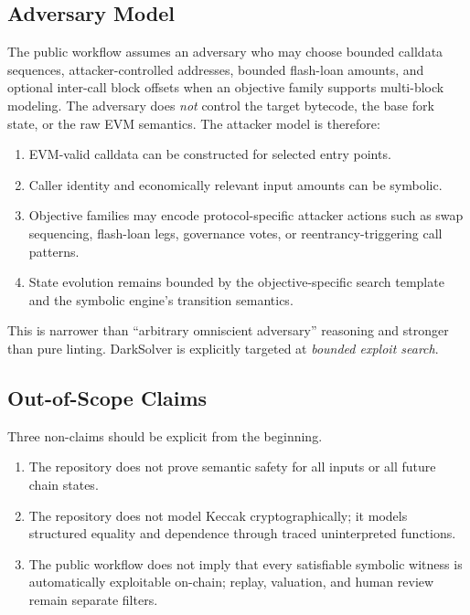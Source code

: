 \documentclass[11pt]{article}
\numberwithin{equation}{section}
\theoremstyle{remark}
\begin{document}
\subsection{Adversary Model}

The public workflow assumes an adversary who may choose bounded calldata sequences, attacker-controlled addresses, bounded flash-loan amounts, and optional inter-call block offsets when an objective family supports multi-block modeling. The adversary does \emph{not} control the target bytecode, the base fork state, or the raw EVM semantics. The attacker model is therefore:
\begin{enumerate}[leftmargin=1.5em]
  \item EVM-valid calldata can be constructed for selected entry points.
  \item Caller identity and economically relevant input amounts can be symbolic.
  \item Objective families may encode protocol-specific attacker actions such as swap sequencing, flash-loan legs, governance votes, or reentrancy-triggering call patterns.
  \item State evolution remains bounded by the objective-specific search template and the symbolic engine's transition semantics.
\end{enumerate}

This is narrower than ``arbitrary omniscient adversary'' reasoning and stronger than pure linting. DarkSolver is explicitly targeted at \emph{bounded exploit search}.

\subsection{Out-of-Scope Claims}

Three non-claims should be explicit from the beginning.
\begin{enumerate}[leftmargin=1.5em]
  \item The repository does not prove semantic safety for all inputs or all future chain states.
  \item The repository does not model Keccak cryptographically; it models structured equality and dependence through traced uninterpreted functions.
  \item The public workflow does not imply that every satisfiable symbolic witness is automatically exploitable on-chain; replay, valuation, and human review remain separate filters.
\end{enumerate}
\end{document}
